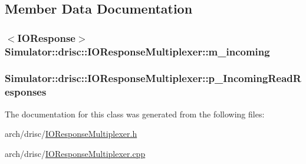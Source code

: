 \subsection{Member Data Documentation}
\hypertarget{class_simulator_1_1drisc_1_1_i_o_response_multiplexer_ae4b08146efe17bd050928d579e7b27be}{
\subsubsection[{m\+\_\+incoming}]{$<$I\+O\+Response$>$ Simulator\+::drisc\+::\+I\+O\+Response\+Multiplexer\+::m\+\_\+incoming}}\label{class_simulator_1_1drisc_1_1_i_o_response_multiplexer_ae4b08146efe17bd050928d579e7b27be}
\hypertarget{class_simulator_1_1drisc_1_1_i_o_response_multiplexer_ae1734f76ad36396e574be9a2d7c26eb7}{
\subsubsection[{p\+\_\+\+Incoming\+Read\+Responses}]{ Simulator\+::drisc\+::\+I\+O\+Response\+Multiplexer\+::p\+\_\+\+Incoming\+Read\+Responses}}\label{class_simulator_1_1drisc_1_1_i_o_response_multiplexer_ae1734f76ad36396e574be9a2d7c26eb7}


The documentation for this class was generated from the following files\+:\begin{DoxyCompactItemize}
\item 
arch/drisc/\hyperlink{_i_o_response_multiplexer_8h}{I\+O\+Response\+Multiplexer.\+h}\item 
arch/drisc/\hyperlink{_i_o_response_multiplexer_8cpp}{I\+O\+Response\+Multiplexer.\+cpp}\end{DoxyCompactItemize}
